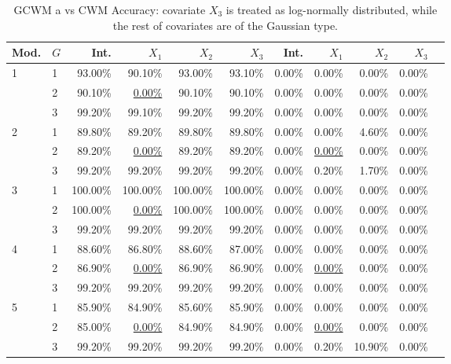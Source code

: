 \documentclass[11pt,letterpaper]{article}
\numberwithin{equation}{section}
\numberwithin{equation}{section}
\numberwithin{equation}{section}
\begin{document}
\begin{table}[!htb]
\centering
\caption{GCWM a vs CWM Accuracy: covariate $X_3$ is treated as log-normally distributed, while the rest of covariates are of the Gaussian type.}
\label{gcwmAccuracy}
\begin{tabular}{ll|rrrr|rrrrr}
\hline
Mod. & $G$ & Int. & $X_1$ &$X_2$ & $X_3$& Int. & $X_1$ &$X_2$ & $X_3$  \\
\hline
1     & 1         & 93.00\%   & 90.10\%  & 93.00\%  & 93.10\% & 0.00\% & 0.00\% & 0.00\% & 0.00\%   \\
      & 2         & 90.10\%   & \underline{0.00\%}   & 90.10\%  & 90.10\% & 0.00\% & 0.00\% & 0.00\% & 0.00\%  \\
      & 3         & 99.20\%   & 99.10\%  & 99.20\%  & 99.20\% & 0.00\% & 0.00\% & 0.00\% & 0.00\%  \\
      \hline
2     & 1         & 89.80\%   & 89.20\%  & 89.80\%  & 89.80\% & 0.00\% & 0.00\% & 4.60\% & 0.00\%  \\
      & 2         & 89.20\%   &\underline{0.00\%}   & 89.20\%  & 89.20\% & 0.00\% & \underline{0.00\%} & 0.00\% & 0.00\%   \\
      & 3         & 99.20\%   & 99.20\%  & 99.20\%  & 99.20\% & 0.00\% & 0.20\% & 1.70\% & 0.00\%  \\
      \hline
3     & 1         & 100.00\%  & 100.00\% & 100.00\% & 100.00\%  & 0.00\% & 0.00\% & 0.00\% & 0.00\% \\
      & 2         & 100.00\%  & \underline{0.00\%}   & 100.00\% & 100.00\% & 0.00\% & 0.00\% & 0.00\% & 0.00\% \\
      & 3         & 99.20\%   & 99.20\%  & 99.20\%  & 99.20\%  & 0.00\% & 0.00\% & 0.00\% & 0.00\%\\
      \hline
      4 & 1 & 88.60\% & 86.80\% & 88.60\% & 87.00\%  & 0.00\% & 0.00\% & 0.00\%  & 0.00\%  \\
  & 2 & 86.90\% &\underline{ 0.00\%}  & 86.90\% & 86.90\% & 0.00\% & \underline{0.00\%} & 0.00\%  & 0.00\%  \\
  & 3 & 99.20\% & 99.20\% & 99.20\% & 99.20\% & 0.00\% & 0.00\% & 0.00\%  & 0.00\% \\
      \hline
5 & 1 & 85.90\% & 84.90\% & 85.60\% & 85.90\% & 0.00\% & 0.00\% & 0.00\%  & 0.00\% \\
  & 2 & 85.00\% &\underline{ 0.00\%}  & 84.90\% & 84.90\% & 0.00\% & \underline{0.00\%} & 0.00\%  & 0.00\%  \\
  & 3 & 99.20\% & 99.20\% & 99.20\% & 99.20\% & 0.00\% & 0.20\% & 10.90\% & 0.00\% \\
      \hline
\end{tabular}
\end{table}
\end{document}
